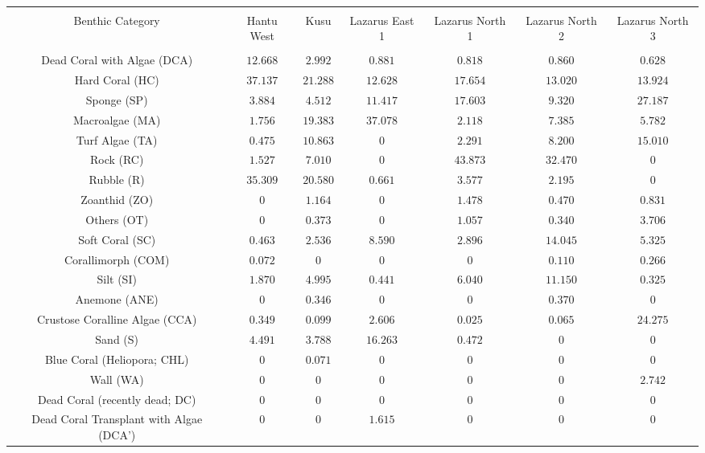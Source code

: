 \documentclass{article}
\begin{document}
\begin{table}[!htbp] \centering 
  \caption*{} 
  \label{} 
\begin{tabular}{@{\extracolsep{5pt}} ccccccc} 
\\[-1.8ex]\hline 
\hline \\[-1.8ex] 
Benthic Category & Hantu West & Kusu & Lazarus East 1 & Lazarus North 1 & Lazarus North 2 & Lazarus North 3 \\ 
\hline \\[-1.8ex] 
Dead Coral with Algae (DCA) & $12.668$ & $2.992$ & $0.881$ & $0.818$ & $0.860$ & $0.628$ \\ 
Hard Coral (HC) & $37.137$ & $21.288$ & $12.628$ & $17.654$ & $13.020$ & $13.924$ \\ 
Sponge (SP) & $3.884$ & $4.512$ & $11.417$ & $17.603$ & $9.320$ & $27.187$ \\ 
Macroalgae (MA) & $1.756$ & $19.383$ & $37.078$ & $2.118$ & $7.385$ & $5.782$ \\ 
Turf Algae (TA) & $0.475$ & $10.863$ & $0$ & $2.291$ & $8.200$ & $15.010$ \\ 
Rock (RC) & $1.527$ & $7.010$ & $0$ & $43.873$ & $32.470$ & $0$ \\ 
Rubble (R) & $35.309$ & $20.580$ & $0.661$ & $3.577$ & $2.195$ & $0$ \\ 
Zoanthid (ZO) & $0$ & $1.164$ & $0$ & $1.478$ & $0.470$ & $0.831$ \\ 
Others (OT)  & $0$ & $0.373$ & $0$ & $1.057$ & $0.340$ & $3.706$ \\ 
Soft Coral (SC) & $0.463$ & $2.536$ & $8.590$ & $2.896$ & $14.045$ & $5.325$ \\ 
Corallimorph (COM)  & $0.072$ & $0$ & $0$ & $0$ & $0.110$ & $0.266$ \\ 
Silt (SI) & $1.870$ & $4.995$ & $0.441$ & $6.040$ & $11.150$ & $0.325$ \\ 
Anemone (ANE) & $0$ & $0.346$ & $0$ & $0$ & $0.370$ & $0$ \\ 
Crustose Coralline Algae (CCA) & $0.349$ & $0.099$ & $2.606$ & $0.025$ & $0.065$ & $24.275$ \\ 
Sand (S) & $4.491$ & $3.788$ & $16.263$ & $0.472$ & $0$ & $0$ \\ 
Blue Coral (Heliopora; CHL) & $0$ & $0.071$ & $0$ & $0$ & $0$ & $0$ \\ 
Wall (WA) & $0$ & $0$ & $0$ & $0$ & $0$ & $2.742$ \\ 
Dead Coral (recently dead; DC) & $0$ & $0$ & $0$ & $0$ & $0$ & $0$ \\ 
Dead Coral Transplant with Algae (DCA') & $0$ & $0$ & $1.615$ & $0$ & $0$ & $0$ \\ 

\end{tabular}
\end{table}
\end{document}
